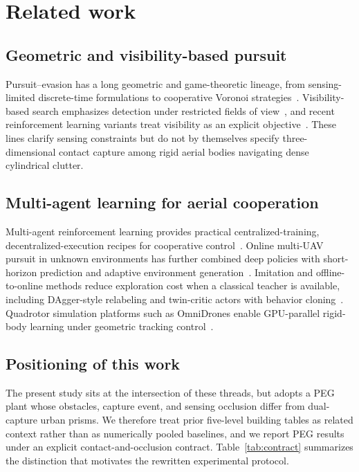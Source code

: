 \documentclass{SCIS2026}
\begin{document}
\section{Related work}
\subsection{Geometric and visibility-based pursuit}
Pursuit--evasion has a long geometric and game-theoretic lineage, from sensing-limited discrete-time formulations to cooperative Voronoi strategies~\cite{bopardikar2008,zhou2016,lavalle2006}. Visibility-based search emphasizes detection under restricted fields of view~\cite{gerkey2006}, and recent reinforcement learning variants treat visibility as an explicit objective~\cite{viper2025}. These lines clarify sensing constraints but do not by themselves specify three-dimensional contact capture among rigid aerial bodies navigating dense cylindrical clutter.

\subsection{Multi-agent learning for aerial cooperation}
Multi-agent reinforcement learning provides practical centralized-training, decentralized-execution recipes for cooperative control~\cite{yu2022}. Online multi-UAV pursuit in unknown environments has further combined deep policies with short-horizon prediction and adaptive environment generation~\cite{open2024}. Imitation and offline-to-online methods reduce exploration cost when a classical teacher is available, including DAgger-style relabeling and twin-critic actors with behavior cloning~\cite{ross2011,fujimoto2018,fujimoto2021}. Quadrotor simulation platforms such as OmniDrones enable GPU-parallel rigid-body learning under geometric tracking control~\cite{xu2024omnidrones,lee2010}.

\subsection{Positioning of this work}
The present study sits at the intersection of these threads, but adopts a PEG plant whose obstacles, capture event, and sensing occlusion differ from dual-capture urban prisms. We therefore treat prior five-level building tables as related context rather than as numerically pooled baselines, and we report PEG results under an explicit contact-and-occlusion contract. Table~\ref{tab:contract} summarizes the distinction that motivates the rewritten experimental protocol.
\end{document}
